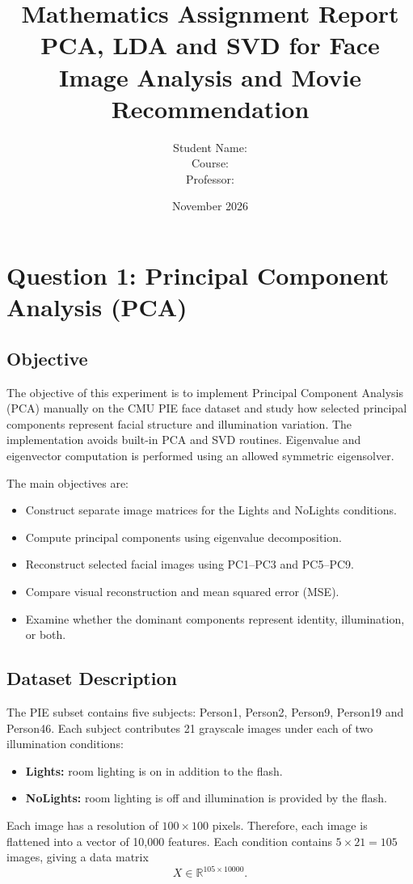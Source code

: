 \documentclass[12pt,a4paper]{report}
\title{\textbf{Mathematics Assignment Report}\\[0.5em]
\large PCA, LDA and SVD for Face Image Analysis and Movie Recommendation}
\author{Student Name: \underline{\hspace{7cm}}\\[0.5em]
Course: \underline{\hspace{7.7cm}}\\
Professor: \underline{\hspace{7.3cm}}}
\date{November 2026}
\begin{document}
\maketitle
{}
\tableofcontents
\clearpage
{}

\chapter{Question 1: Principal Component Analysis (PCA)}

\section{Objective}
The objective of this experiment is to implement Principal Component Analysis (PCA) manually on the CMU PIE face dataset and study how selected principal components represent facial structure and illumination variation. The implementation avoids built-in PCA and SVD routines. Eigenvalue and eigenvector computation is performed using an allowed symmetric eigensolver.

The main objectives are:
\begin{itemize}[nosep]
    \item Construct separate image matrices for the Lights and NoLights conditions.
    \item Compute principal components using eigenvalue decomposition.
    \item Reconstruct selected facial images using PC1--PC3 and PC5--PC9.
    \item Compare visual reconstruction and mean squared error (MSE).
    \item Examine whether the dominant components represent identity, illumination, or both.
\end{itemize}

\section{Dataset Description}
The PIE subset contains five subjects: Person1, Person2, Person9, Person19 and Person46. Each subject contributes 21 grayscale images under each of two illumination conditions:
\begin{itemize}[nosep]
    \item \textbf{Lights:} room lighting is on in addition to the flash.
    \item \textbf{NoLights:} room lighting is off and illumination is provided by the flash.
\end{itemize}
Each image has a resolution of $100\times100$ pixels. Therefore, each image is flattened into a vector of 10,000 features. Each condition contains $5\times21=105$ images, giving a data matrix
\[
X\in\mathbb{R}^{105\times10000}.
\]
\end{document}
